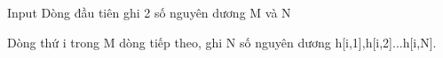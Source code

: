 Input
Dòng đầu tiên ghi 2 số nguyên dương M và N  

   Dòng thứ i trong M dòng tiếp theo, ghi N số nguyên dương h[i,1],h[i,2]...h[i,N].